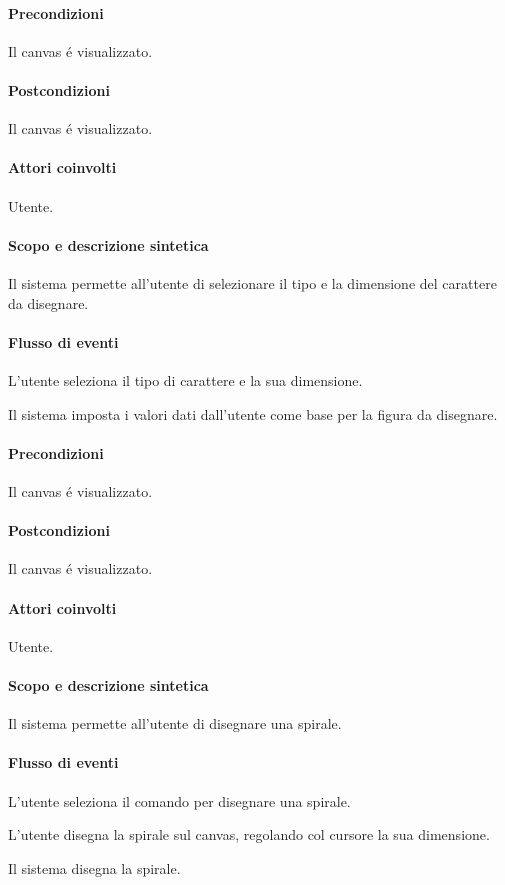 \paragraph{Precondizioni} Il canvas \'e visualizzato.
\paragraph{Postcondizioni} Il canvas \'e visualizzato.

\paragraph{Attori coinvolti} Utente.
\paragraph{Scopo e descrizione sintetica} 
Il sistema permette all'utente di selezionare il tipo e la dimensione del carattere da disegnare.
\paragraph{Flusso di eventi}
\begin{elenconumerato}[\textbf{}]{\subsubsecindent}
\item L'utente seleziona il tipo di carattere e la sua dimensione.
\item Il sistema imposta i valori dati dall'utente come base per la figura da disegnare.
\end{elenconumerato}
\paragraph{Precondizioni} Il canvas \'e visualizzato.
\paragraph{Postcondizioni} Il canvas \'e visualizzato.

\paragraph{Attori coinvolti} Utente.
\paragraph{Scopo e descrizione sintetica} 
Il sistema permette all'utente di disegnare una spirale.
\paragraph{Flusso di eventi}
\begin{elenconumerato}[\textbf{}]{\subsubsecindent}
\item L'utente seleziona il comando per disegnare una spirale.
\item L'utente disegna la spirale sul canvas, regolando col cursore la sua dimensione.
\item Il sistema disegna la spirale.
\end{elenconumerato}
